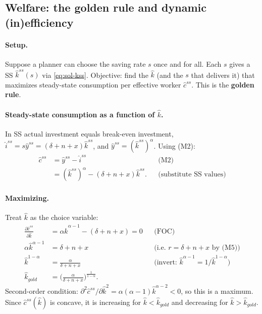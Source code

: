 \subsection{Welfare: the golden rule and dynamic (in)efficiency }

\paragraph{Setup.} Suppose a planner can choose the saving rate $s$ once and for all. Each $s$ gives a SS $\hat k^{ss}(s)$ via \eqref{eq:sol-kss}. Objective: find the $\hat k$ (and the $s$ that delivers it) that maximizes steady-state consumption per effective worker $\hat c^{ss}$. This is the \textbf{golden rule}.

\paragraph{Steady-state consumption as a function of $\hat k$.} In SS actual investment equals break-even investment, $\hat i^{ss}=s\hat y^{ss}=(\delta+n+x)\hat k^{ss}$, and $\hat y^{ss}=(\hat k^{ss})^{\alpha}$. Using (M2):
\begin{align*}
\hat c^{ss} &= \hat y^{ss}-\hat i^{ss} && \text{(M2)}\\
&= (\hat k^{ss})^{\alpha}-(\delta+n+x)\hat k^{ss}. && \text{(substitute SS values)}
\end{align*}

\paragraph{Maximizing.} Treat $\hat k$ as the choice variable:
\begin{align*}
\frac{\partial\hat c^{ss}}{\partial\hat k} &= \alpha\hat k^{\alpha-1}-(\delta+n+x)=0 && \text{(FOC)}\\
\alpha\hat k^{\alpha-1} &= \delta+n+x && \text{(i.e.\ $r=\delta+n+x$ by (M5))}\\
\hat k^{1-\alpha} &= \frac{\alpha}{\delta+n+x} && \text{(invert: $\hat k^{\alpha-1}=1/\hat k^{1-\alpha}$)}\\
\hat k_{gold} &= \Big(\frac{\alpha}{\delta+n+x}\Big)^{\frac{1}{1-\alpha}} .
\end{align*}
Second-order condition: $\partial^2\hat c^{ss}/\partial\hat k^2=\alpha(\alpha-1)\hat k^{\alpha-2}<0$, so this is a maximum. Since $\hat c^{ss}(\hat k)$ is concave, it is increasing for $\hat k<\hat k_{gold}$ and decreasing for $\hat k>\hat k_{gold}$.

